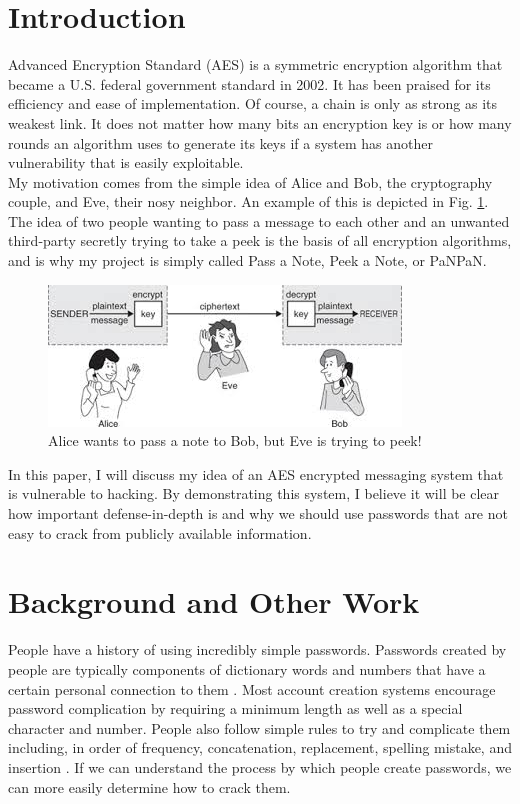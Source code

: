 \documentclass[conference]{csce}
\begin{document}
\section{Introduction}
Advanced Encryption Standard (AES) is a symmetric encryption algorithm that became a U.S. federal government standard in 2002. It has been praised for its efficiency and ease of implementation. Of course, a chain is only as strong as its weakest link. It does not matter how many bits an encryption key is or how many rounds an algorithm uses to generate its keys if a system has another vulnerability that is easily exploitable. \\
\indent My motivation comes from the simple idea of Alice and Bob, the cryptography couple, and Eve, their nosy neighbor. An example of this is depicted in Fig. \ref{fig:abe}. The idea of two people wanting to pass a message to each other and an unwanted third-party secretly trying to take a peek is the basis of all encryption algorithms, and is why my project is simply called Pass a Note, Peek a Note, or PaNPaN. \\
\begin{figure}
    \centering
    \includegraphics[width=\columnwidth]{AliceBobEve.jpeg}
    \caption{Alice wants to pass a note to Bob, but Eve is trying to peek!}
    \label{fig:abe}
\end{figure}
\indent In this paper, I will discuss my idea of an AES encrypted messaging system that is vulnerable to hacking. By demonstrating this system, I believe it will be clear how important defense-in-depth is and why we should use passwords that are not easy to crack from publicly available information. 

\section{Background and Other Work}
People have a history of using incredibly simple passwords. Passwords created by people are typically components of dictionary words and numbers that have a certain personal connection to them \cite{understanding passwords}. Most account creation systems encourage password complication by requiring a minimum length as well as a special character and number. People also follow simple rules to try and complicate them including, in order of frequency, concatenation, replacement, spelling mistake, and insertion \cite{understanding passwords}. If we can understand the process by which people create passwords, we can more easily determine how to crack them. 
\end{document}

